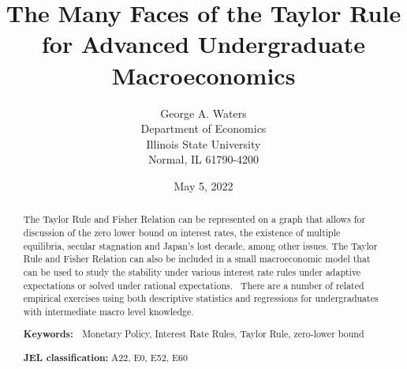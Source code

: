 \documentclass{article}
\begin{document}
\title{The Many Faces of the Taylor Rule for Advanced Undergraduate
Macroeconomics}
\date{\textsf{May 5, 2022}}
\author{George A. Waters \\
Department of Economics\\
Illinois State University\\
Normal, IL 61790-4200}
\maketitle

\begin{abstract}
The Taylor Rule and Fisher Relation can be represented on a graph that
allows for discussion of the zero lower bound on interest rates, the
existence of multiple equilibria, secular stagnation and Japan's lost
decade, among other issues. The Taylor Rule and Fisher Relation can also be
included in a small macroeconomic model that can be used to study the
stability under various interest rate rules under adaptive expectations or
solved under rational expectations. \ There are a number of related
empirical exercises using both descriptive statistics and regressions for
undergraduates with intermediate macro level knowledge.

\textbf{Keywords: \ }Monetary Policy, Interest Rate Rules, Taylor Rule,
zero-lower bound

\textbf{JEL classification: }A22, E0, E52, E60
\end{abstract}
\end{document}
